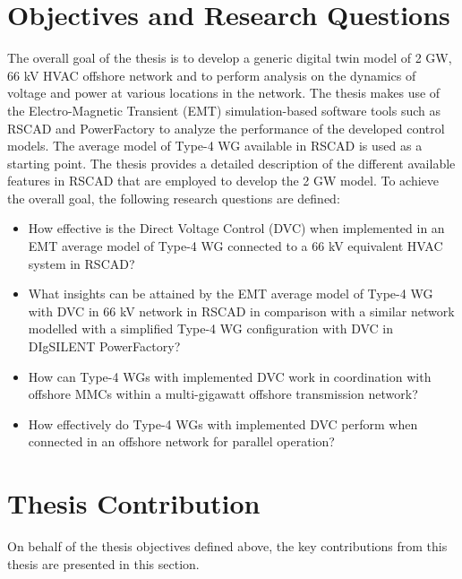 \section{Objectives and Research Questions}
The overall goal of the thesis is to develop a generic digital twin model of 2 GW, 66 kV \gls{HVAC} offshore network and to perform analysis on the dynamics of voltage and power at various locations in the network. The thesis makes use of the Electro-Magnetic Transient (\gls{EMT}) simulation-based software tools such as RSCAD and PowerFactory to analyze the performance of the developed control models. The average model of Type-4 \gls{WG} available in RSCAD is used as a starting point. The thesis provides a detailed description of the different available features in RSCAD that are employed to develop the 2 GW model. 
To achieve the overall goal, the following research questions are defined:
\begin{itemize}
    \item How effective is the Direct Voltage Control (\gls{DVC}) when implemented in an \gls{EMT} average model of Type-4 \gls{WG} connected to a 66 kV equivalent \gls{HVAC} system in RSCAD?
    
    \item What insights can be attained by the \gls{EMT} average model of Type-4 \gls{WG} with \gls{DVC} in 66 kV network in RSCAD in comparison with a similar network modelled with a simplified Type-4 \gls{WG} configuration with \gls{DVC} in DIgSILENT PowerFactory?
    
    \item How can Type-4 \gls{WG}s with implemented \gls{DVC} work in coordination with offshore \gls{MMC}s within a multi-gigawatt offshore transmission network?
    
    \item How effectively do Type-4 \gls{WG}s with implemented \gls{DVC} perform when connected in an offshore network for parallel operation?

\end{itemize}

\section{Thesis Contribution}
On behalf of the thesis objectives defined above, the key contributions from this thesis are presented in this section.

